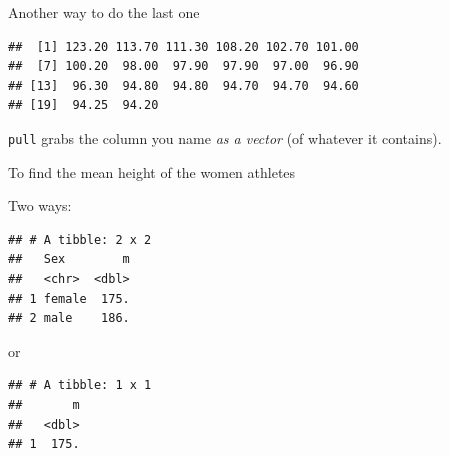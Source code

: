 \documentclass[ignorenonframetext,]{beamer}
\newenvironment{Shaded}{\begin{snugshade}}{\end{snugshade}}
\newcommand{\DataTypeTok}[1]{\textcolor[rgb]{0.13,0.29,0.53}{#1}}
\newcommand{\DecValTok}[1]{\textcolor[rgb]{0.00,0.00,0.81}{#1}}
\newcommand{\KeywordTok}[1]{\textcolor[rgb]{0.13,0.29,0.53}{\textbf{#1}}}
\newcommand{\NormalTok}[1]{#1}
\newcommand{\OperatorTok}[1]{\textcolor[rgb]{0.81,0.36,0.00}{\textbf{#1}}}
\newcommand{\StringTok}[1]{\textcolor[rgb]{0.31,0.60,0.02}{#1}}
\begin{document}
\begin{frame}[fragile]{Another way to do the last one}
\protect\hypertarget{another-way-to-do-the-last-one}{}

\begin{Shaded}
\end{Shaded}

\begin{verbatim}
##  [1] 123.20 113.70 111.30 108.20 102.70 101.00
##  [7] 100.20  98.00  97.90  97.90  97.00  96.90
## [13]  96.30  94.80  94.80  94.70  94.70  94.60
## [19]  94.25  94.20
\end{verbatim}

\texttt{pull} grabs the column you name \emph{as a vector} (of whatever
it contains).

\end{frame}

\begin{frame}[fragile]{To find the mean height of the women athletes}
\protect\hypertarget{to-find-the-mean-height-of-the-women-athletes}{}

Two ways:

\begin{Shaded}
\end{Shaded}

\begin{verbatim}
## # A tibble: 2 x 2
##   Sex        m
##   <chr>  <dbl>
## 1 female  175.
## 2 male    186.
\end{verbatim}

or

\begin{Shaded}
\end{Shaded}

\begin{verbatim}
## # A tibble: 1 x 1
##       m
##   <dbl>
## 1  175.
\end{verbatim}

\end{frame}
\end{document}
